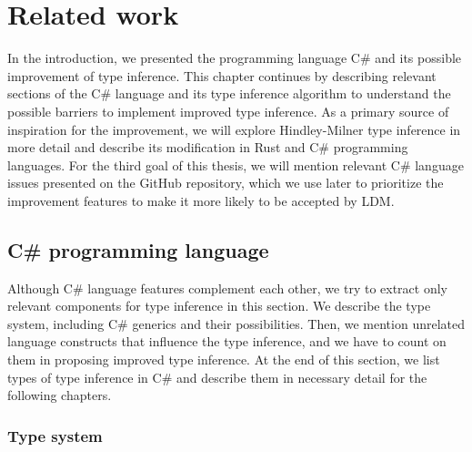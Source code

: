 \chapter{Related work}

In the introduction, we presented the programming language C\# and its possible improvement of type inference. 
This chapter continues by describing relevant sections of the C\# language and its type inference algorithm to understand the possible barriers to implement improved type inference. 
As a primary source of inspiration for the improvement, we will explore Hindley-Milner type inference in more detail and describe its modification in Rust and C\# programming languages. 
For the third goal of this thesis, we will mention relevant C\# language issues presented on the GitHub repository, which we use later to prioritize the improvement features to make it more likely to be accepted by \ac{LDM}. 

\section{C\# programming language}

Although C\# language features complement each other, we try to extract only relevant components for type inference in this section. 
We describe the type system, including C\# generics and their possibilities. 
Then, we mention unrelated language constructs that influence the type inference, and we have to count on them in proposing improved type inference. 
At the end of this section, we list types of type inference in C\# and describe them in necessary detail for the following chapters.

\subsection{Type system}


